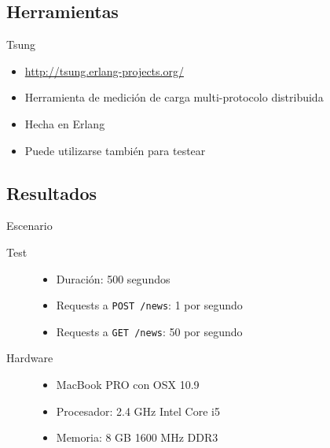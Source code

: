 \documentclass[utf8,hyperref={colorlinks=true}]{beamer}
\begin{document}
\subsection{Herramientas}
\begin{frame}{Tsung}
	\begin{itemize}
		\item \href{http://tsung.erlang-projects.org/}{http://tsung.erlang-projects.org/}
		\item<+-> Herramienta de medici\'on de carga multi-protocolo distribuida
		\item<+-> Hecha en Erlang
		\item<+-> Puede utilizarse tambi\'en para testear
	\end{itemize}
\end{frame}

\subsection{Resultados}
\begin{frame}{Escenario}
	\begin{description}
		\item[Test]\begin{itemize}
			\item Duraci\'on: 500 segundos
			\item Requests a \texttt{POST /news}: 1 por segundo
			\item Requests a \texttt{GET /news}: 50 por segundo
		\end{itemize}
		\item[Hardware]\begin{itemize}
			\item MacBook PRO con OSX 10.9
			\item Procesador: 2.4 GHz Intel Core i5
			\item Memoria: 8 GB 1600 MHz DDR3
		\end{itemize}
	\end{description}

\end{frame}
\end{document}
